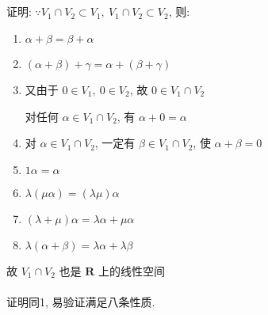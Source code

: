  \subsection{} %

	 \paragraph{} %
		 证明: \(\because V_{1} \cap V_{2} \subset V_{1},\ V_{1} \cap V_{2} \subset V_{2}\), 则:

		 \begin{enumerate}[label=(\roman*),left=2em]
			 \item %
			       \(\alpha + \beta = \beta + \alpha\)
			 \item %
			       \((\alpha + \beta) + \gamma = \alpha + (\beta + \gamma)\)
			 \item %
			       又由于 \(0 \in V_{1},\ 0 \in V_{2}\), 故 \(0 \in V_{1} \cap V_{2}\)

			       对任何 \(\alpha \in V_{1} \cap V_{2}\), 有 \(\alpha + 0 = \alpha\)

			 \item %
			       对 \(\alpha \in V_{1} \cap V_{2}\), 一定有 \(\beta \in V_{1} \cap V_{2}\), 使 \(\alpha + \beta = 0\)
			 \item %
			       \(1\alpha=\alpha\)
			 \item %
			       \(\lambda(\mu\alpha) = (\lambda\mu)\alpha\)
			 \item %
			       \((\lambda + \mu)\alpha = \lambda\alpha + \mu\alpha\)
			 \item %
			       \(\lambda(\alpha + \beta) = \lambda\alpha + \lambda\beta\)
		 \end{enumerate}
		 故 \(V_{1} \cap V_{2}\) 也是 \(\mathbf{R}\) 上的线性空间

	 \paragraph{} %
		 证明同1, 易验证满足八条性质.

